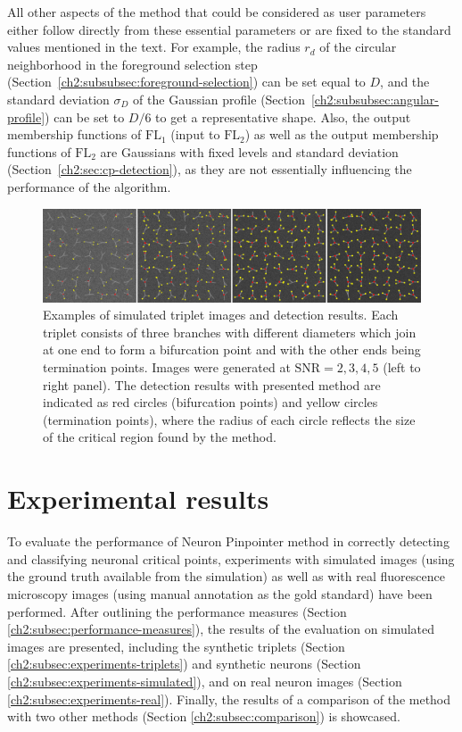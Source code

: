 All other aspects of the method that could be considered as user parameters either follow directly from these essential parameters or are fixed to the standard values mentioned in the text. For example, the radius $r_d$ of the circular neighborhood in the foreground selection step (Section~\ref{ch2:subsubsec:foreground-selection}) can be set equal to $D$, and the standard deviation $\sigma_{\!D}$ of the Gaussian profile (Section~\ref{ch2:subsubsec:angular-profile}) can be set to $D/6$ to get a representative shape. Also, the output membership functions of $\textrm{FL}_1$ (input to $\textrm{FL}_2$) as well as the output membership functions of $\textrm{FL}_2$ are Gaussians with fixed levels and standard deviation (Section~\ref{ch2:sec:cp-detection}), as they are not essentially influencing the performance of the algorithm.
\begin{figure}%
	\centering
	\includegraphics[width=\columnwidth]{fig12}
	\caption{Examples of simulated triplet images and detection results. Each triplet consists of three branches with different diameters which join at one end to form a bifurcation point and with the other ends being termination points. Images were generated at $\textrm{SNR}=2,3,4,5$ (left to right panel). The detection results with presented method are indicated as red circles (bifurcation points) and yellow circles (termination points), where the radius of each circle reflects the size of the critical region found by the method.}
	\label{ch2_fig12}
\end{figure}
\section{Experimental results}
\label{ch2:sec:experiments}
To evaluate the performance of Neuron Pinpointer method in correctly detecting and classifying neuronal critical points, experiments with simulated images (using the ground truth available from the simulation) as well as with real fluorescence microscopy images (using manual annotation as the gold standard) have been performed. After outlining the performance measures (Section \ref{ch2:subsec:performance-measures}), the results of the evaluation on simulated images are presented, including the synthetic triplets (Section \ref{ch2:subsec:experiments-triplets}) and synthetic neurons (Section \ref{ch2:subsec:experiments-simulated}), and on real neuron images (Section \ref{ch2:subsec:experiments-real}). Finally, the results of a comparison of the method with two other methods (Section \ref{ch2:subsec:comparison}) is showcased.
